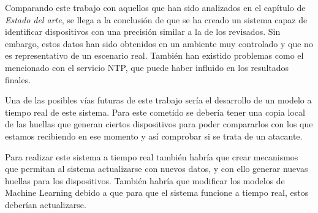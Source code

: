 Comparando este trabajo con aquellos que han sido analizados en el capítulo de \textit{Estado del arte}, se llega a la conclusión de que se ha creado un sistema capaz de identificar dispositivos con una precisión similar a la de los revisados. Sin embargo, estos datos han sido obtenidos en un ambiente muy controlado y que no es representativo de un escenario real. También han existido problemas como el mencionado con el servicio NTP, que puede haber influido en los resultados finales.

Una de las posibles vías futuras de este trabajo sería el desarrollo de un modelo a tiempo real de este sistema. Para este cometido se debería tener una copia local de las huellas que generan ciertos dispositivos para poder compararlos con los que estamos recibiendo en ese momento y así comprobar si se trata de un atacante.

Para realizar este sistema a tiempo real también habría que crear mecanismos que permitan al sistema actualizarse con nuevos datos, y con ello generar nuevas huellas para los dispositivos. También habría que modificar los modelos de Machine Learning debido a que para que el sistema funcione a tiempo real, estos deberían actualizarse. 


